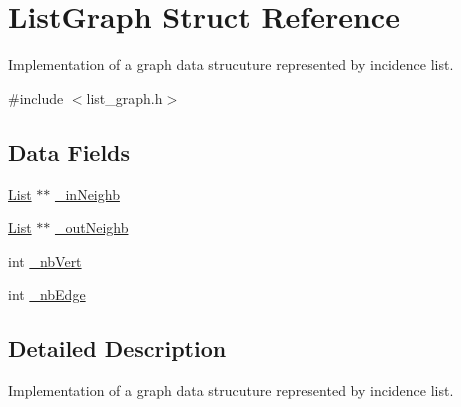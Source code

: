 \hypertarget{struct_list_graph}{\section{List\-Graph Struct Reference}
\label{struct_list_graph}
}


Implementation of a graph data strucuture represented by incidence list.  




{\ttfamily \#include $<$list\-\_\-graph.\-h$>$}

\subsection*{Data Fields}
\begin{DoxyCompactItemize}
\item 
\hyperlink{struct_list}{List} $\ast$$\ast$ \hyperlink{struct_list_graph_aa1424e60acb846a17dd5429ad3fb9274}{\-\_\-in\-Neighb}
\item 
\hyperlink{struct_list}{List} $\ast$$\ast$ \hyperlink{struct_list_graph_a386fbb3e3e91bf7bc246642dec395fcc}{\-\_\-out\-Neighb}
\item 
int \hyperlink{struct_list_graph_a3da3524d8a5c0b61107c4d25f8d23832}{\-\_\-nb\-Vert}
\item 
int \hyperlink{struct_list_graph_a69fef280661aff966495a7c668e73284}{\-\_\-nb\-Edge}
\end{DoxyCompactItemize}


\subsection{Detailed Description}
Implementation of a graph data strucuture represented by incidence list. 

